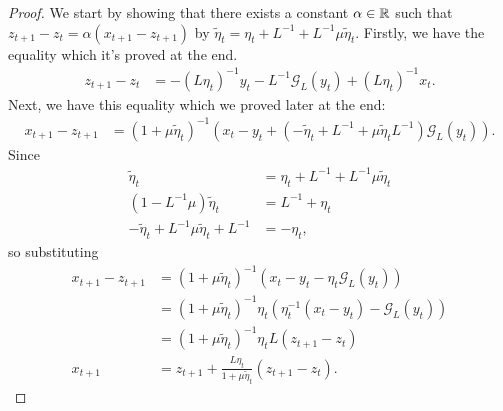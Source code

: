 \documentclass[12pt]{article}
\begin{document}
        \begin{proof}
            We start by showing that there exists a constant $\alpha \in \mathbb R$ such that $z_{t + 1} - z_t = \alpha (x_{t + 1} - z_{t + 1})$ by $\tilde \eta_{t} = \eta_t + L^{-1} + L^{-1} \mu \tilde \eta_{t}$. 
            Firstly, we have the equality which it's proved at the end. 
            \begin{align*}
                z_{t + 1} - z_t
                &= 
                - (L\eta_t)^{-1} y_t 
                - L^{-1}\mathcal G_L(y_t) + (L \eta_t)^{-1} x_t. 
                \tag{1}
            \end{align*}
            Next, we have this equality which we proved later at the end: 
            \begin{align*}
                x_{t + 1} - z_{t + 1}
                &= 
                (1 + \mu\tilde \eta_{t})^{-1}
                \left(
                    x_t - y_t +     
                    \left(
                        - \tilde \eta_{t} + L^{-1}
                        + \mu \tilde \eta_{t}L^{-1}
                    \right)
                    \mathcal G_L(y_t)
                \right).\tag{2} 
            \end{align*}
            Since 
            \begin{align*}
                \tilde\eta_{t} &= \eta_t + L^{-1} + L^{-1} \mu \tilde\eta_{t}
                \\
                (1 - L^{-1}\mu)\tilde \eta_{t}
                &= L^{-1} + \eta_t 
                \\
                - \tilde \eta_{t} + L^{-1}\mu \tilde \eta_{t}
                + L^{-1}
                &= - \eta_t, 
            \end{align*}
            so substituting 
            \begin{align*}
                x_{t + 1} - z_{t + 1}
                &= 
                (1 + \mu \tilde \eta_{t})^{-1}
                (x_t - y_t - \eta_t \mathcal G_L(y_t))
                \\
                &= (1 + \mu \tilde \eta_{t})^{-1}
                \eta_t(\eta_{t}^{-1}(x_t - y_t) - \mathcal G_L(y_t))
                \\
                &= (1 + \mu \tilde \eta_{t})^{-1}
                \eta_t L(z_{t + 1} - z_t)
                \\
                x_{t + 1} &= 
                z_{t + 1} + 
                \frac{L \eta_t}{1 + \mu \tilde \eta_t}(z_{t + 1} - z_t). 
            \end{align*}

\end{proof}
\end{document}
